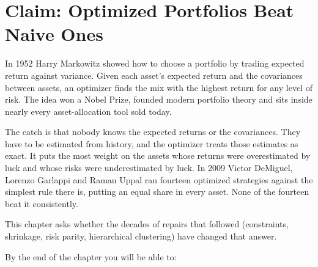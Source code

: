 \makeatletter
{}
\makeatother

\chapter{Claim: Optimized Portfolios Beat Naive Ones}
\label{ch:19}

In 1952 Harry Markowitz showed how to choose a portfolio by trading expected return against variance. Given each asset's expected return and the covariances between assets, an optimizer finds the mix with the highest return for any level of risk. The idea won a Nobel Prize, founded modern portfolio theory and sits inside nearly every asset-allocation tool sold today.

The catch is that nobody knows the expected returns or the covariances. They have to be estimated from history, and the optimizer treats those estimates as exact. It puts the most weight on the assets whose returns were overestimated by luck and whose risks were underestimated by luck. In 2009 Victor DeMiguel, Lorenzo Garlappi and Raman Uppal ran fourteen optimized strategies against the simplest rule there is, putting an equal share in every asset. None of the fourteen beat it consistently.

This chapter asks whether the decades of repairs that followed (constraints, shrinkage, risk parity, hierarchical clustering) have changed that answer.

By the end of the chapter you will be able to:

